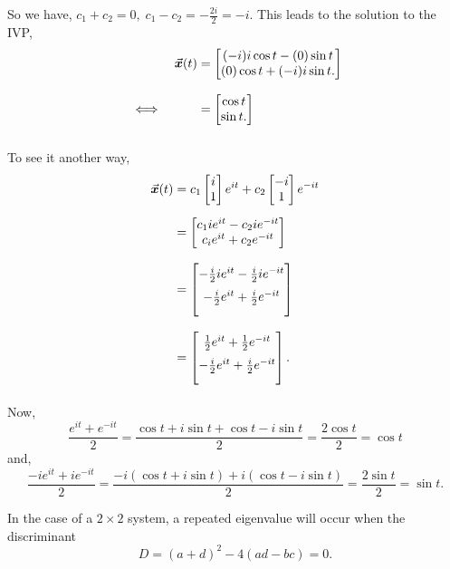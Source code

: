 \documentclass[../MathsNotesBase.tex]{subfiles}
\begin{document}
{\begin{exe}
{				So we have, ${ c_1 + c_2 = 0, \; c_1 - c_2 = -\frac{2i}{2} = -i }$. This leads to the solution to the IVP,
				\[\begin{aligned}
					&& \x(t) &= \begin{bmatrix}
						(-i) i \cos{t} - (0) \sin{t} \\
						(0) \cos{t} + (-i) i \sin{t}.
					\end{bmatrix} \nnn
					&\iff &  &= \begin{bmatrix}
						\cos{t} \\
						\sin{t}.
					\end{bmatrix} \nnn
				\end{aligned}\]
				
				To see it another way,
				\[\begin{aligned}
					\x(t) &= c_1 \begin{bmatrix}i\\ 1\end{bmatrix} e^{it} + c_2 \begin{bmatrix}-i\\ 1\end{bmatrix} e^{-it} \nn
					&=  \begin{bmatrix}
						c_1 i e^{it} - c_2 i e^{-it} \\
						c_i e^{it} + c_2 e^{-it}
					\end{bmatrix} \nnn
					&=  \begin{bmatrix}
						-\frac{i}{2} i e^{it} - \frac{i}{2} i e^{-it} \nn
						-\frac{i}{2} e^{it} + \frac{i}{2} e^{-it} \nn
					\end{bmatrix} \nnn
					&=  \begin{bmatrix}
						\frac{1}{2} e^{it} + \frac{1}{2} e^{-it} \nn
						-\frac{i}{2} e^{it} + \frac{i}{2} e^{-it} \nn
					\end{bmatrix}. \nnn
				\end{aligned}\]
				Now,
				\[ \frac{e^{it} + e^{-it}}{2} = \frac{\cos{t} + i \sin{t} + \cos{t} - i \sin{t}}{2} = \frac{2\cos{t}}{2} = \cos{t} \]
				and,
				\[ \frac{-i e^{it} + i e^{-it}}{2} = \frac{ -i (\cos{t} + i \sin{t}) + i (\cos{t} - i \sin{t}) }{2} = \frac{2\sin{t}}{2} = \sin{t}. \]
			}
		\end{exe}
		
		
		\biggerskip
		
		In the case of a ${ 2 \times 2 }$ system, a repeated eigenvalue will occur when the discriminant
		\[ D = (a+d)^2 - 4(ad - bc) = 0. \]
	
}
\end{document}
